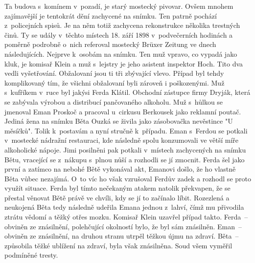 
Ta budova s~komínem v~pozadí, je starý mostecký pivovar. Ovšem mnohem
zajímavější je tentokrát dění zachycené na snímku. Ten patrně pochází
z~policejních spisů. Je na něm totiž zachycena rekonstrukce několika
trestných činů. Ty se udály v~těchto místech 18. září 1898
v~podvečerních hodinách a poměrně podrobně o~nich referoval mostecký
Brüxer Zeitung ve dnech následujících. Nejprve k~osobám na snímku. Ten
muž vpravo, co vypadá jako kluk, je komisař Klein a muž s~lejstry je
jeho asistent inspektor Hoch. Tito dva vedli vyšetřování. Obžalovaní
jsou ti tři zbývající vlevo. Případ byl tehdy komplikovaný tím, že
všichni obžalovaní byli zároveň i poškozenými. Muž s~kufříkem v~ruce
byl jakýsi Ferda Klátil. Obchodní zástupce firmy Dryják, která se
zabývala výrobou a distribucí pančovaného alkoholu. Muž s~hůlkou se
jmenoval Eman Proskoč a pracoval u~cirkusu Berkousek jako reklamní
poutač. Jediná žena na snímku Běta Ouzká se živila jako zásobovačka
nevěstince "U měsíčků". Tolik k~postavám a nyní stručně k~případu.
Eman s~Ferdou se potkali v~mostecké nádražní restauraci, kde následně
spolu konzumovali ve větší míře alkoholické nápoje. Jimi posilněni pak
potkali v~místech zachycených na snímku Bětu, vracející se z~nákupu
s~plnou nůší a rozhodli se jí zmocnit. Ferda šel jako první a zatímco na
nebohé Bětě vykonával akt, Emanovi došlo, že ho vlastně Běta vůbec
nezajímá. O~to víc ho však vzrušoval Ferdův zadek a rozhodl se proto
využít situace. Ferda byl tímto nečekaným atakem natolik překvapen, že
se přestal věnovat Bětě právě ve chvíli, kdy se jí to začínalo líbit.
Rozezlená a neukojená Běta tedy následně udeřila Emana jednou z~lahví,
čímž mu přivodila ztrátu vědomí a těžký otřes mozku. Komisař Klein
uzavřel případ takto. Ferda~-- obviněn ze znásilnění, polehčující
okolností bylo, že byl sám znásilněn. Eman~-- obviněn ze znásilnění,
na druhou stranu utrpěl těžkou újmu na zdraví. Běta~-- způsobila těžké
ublížení na zdraví, byla však znásilněna. Soud všem vyměřil podmíněné
tresty.

